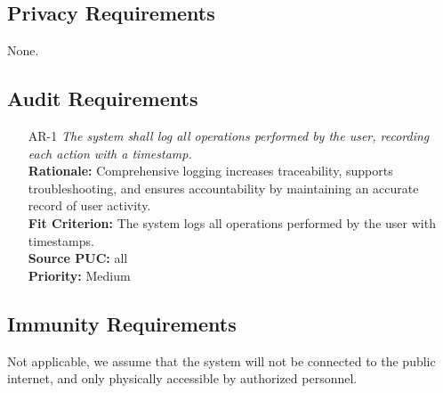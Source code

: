\documentclass[12pt]{article}
\begin{document}
\subsection{Privacy Requirements}

None.

\subsection{Audit Requirements}
\begin{itemize}[leftmargin=*]
  \item[AR-1] \emph{The system shall log all operations performed by the user,
          recording each action with a timestamp.}\\[2mm]
        \textbf{Rationale:} Comprehensive logging increases traceability, supports troubleshooting, and ensures accountability by maintaining an accurate record of user activity.\\
        \textbf{Fit Criterion:} The system logs all operations performed by the user with timestamps.\\
        \textbf{Source PUC:} all \\
        \textbf{Priority:} Medium
\end{itemize}

\subsection{Immunity Requirements}

Not applicable, we assume that the system will not be connected to the public
internet, and only physically accessible by authorized personnel.
\end{document}
